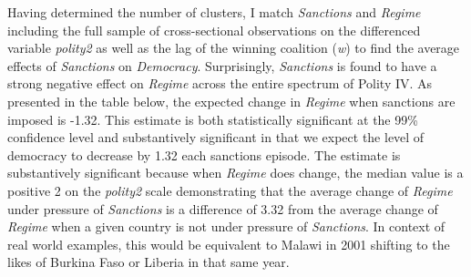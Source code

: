 \documentclass[a4paper]{article}\usepackage[]{graphicx}\usepackage[]{color}
\begin{document}
Having determined the number of clusters, I match \textit{Sanctions} and \textit{Regime} including the full sample of cross-sectional observations on the differenced variable \textit{polity2} as well as the lag of the winning coalition (\textit{w}) to find the average effects of \textit{Sanctions} on \textit{Democracy}. Surprisingly, \textit{Sanctions} is found to have a strong negative effect on \textit{Regime} across the entire spectrum of Polity IV. As presented in the table below, the expected change in \textit{Regime} when sanctions are imposed is -1.32. This estimate is both statistically significant at the 99\% confidence level and substantively significant in that we expect the level of democracy to decrease by 1.32 each sanctions episode. The estimate is substantively significant because when \textit{Regime} does change, the median value is a positive 2 on the \textit{polity2} scale demonstrating that the average change of \textit{Regime} under pressure of \textit{Sanctions} is a difference of 3.32 from the average change of \textit{Regime} when a given country is not under pressure of \textit{Sanctions}. In context of real world examples, this would be equivalent to Malawi in 2001 shifting to the likes of Burkina Faso or Liberia in that same year. 
\par
\end{document}
